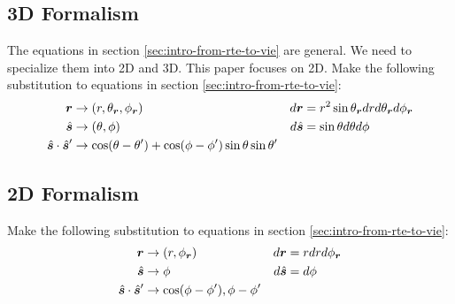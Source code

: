 \documentclass [10pt,letterpaper]{article}
\newcommand{\unitvectorsym}[1]{\hat{\vectorsym{#1}}}
\begin{document}
\subsection{3D Formalism}
The equations in section \ref{sec:intro-from-rte-to-vie} are general. We need to specialize them into 2D and 3D. This paper focuses on 2D.
Make the following substitution to equations in section \ref{sec:intro-from-rte-to-vie}:
\begin{align*}
	\vectorsym{r} & \rightarrow(r,\theta_{\vectorsym{r}},\phi_{\vectorsym{r}}) & d\vectorsym{r} &= r^2 \sin\theta_{\vectorsym{r}} dr d\theta_{\vectorsym{r}}d\phi_{\vectorsym{r}} \\
	\unitvectorsym{s} & \rightarrow(\theta,\phi) & d\unitvectorsym{s} &= \sin\theta d\theta d\phi \\
	\unitvectorsym{s}\cdot\unitvectorsym{s}^\prime & \rightarrow \cos(\theta-\theta^\prime)+\cos(\phi-\phi^\prime)\sin\theta\sin\theta^\prime & & 
\end{align*}

\subsection{2D Formalism}
\label{sub:2d-formalism}
Make the following substitution to equations in section \ref{sec:intro-from-rte-to-vie}:
\begin{align*}
	\vectorsym{r} & \rightarrow(r,\phi_{\vectorsym{r}}) & d\vectorsym{r} &= r dr d\phi_{\vectorsym{r}} \\
	\unitvectorsym{s} & \rightarrow\phi & d\unitvectorsym{s} &= d\phi \\
	\unitvectorsym{s}\cdot\unitvectorsym{s}^\prime & \rightarrow \cos(\phi-\phi^\prime), \phi-\phi^\prime
\end{align*}
\end{document}
